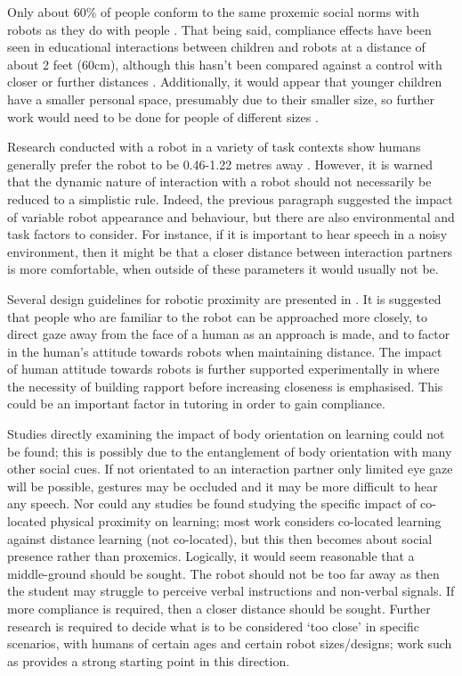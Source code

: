 Only about 60\% of people conform to the same proxemic social norms with robots as they do with people \citep{walters2005influence}. That being said, compliance effects have been seen in educational interactions between children and robots at a distance of about 2 feet (60cm), although this hasn't been compared against a control with closer or further distances \citep{kennedy2014children}. Additionally, it would appear that younger children have a smaller personal space, presumably due to their smaller size, so further work would need to be done for people of different sizes \citep{aiello1974development}.

Research conducted with a robot in a variety of task contexts show humans generally prefer the robot to be 0.46-1.22 metres away \citep{huettenrauch2006investigating}. However, it is warned that the dynamic nature of interaction with a robot should not necessarily be reduced to a simplistic rule. Indeed, the previous paragraph suggested the impact of variable robot appearance and behaviour, but there are also environmental and task factors to consider. For instance, if it is important to hear speech in a noisy environment, then it might be that a closer distance between interaction partners is more comfortable, when outside of these parameters it would usually not be.

Several design guidelines for robotic proximity are presented in \cite{takayama2009influences}. It is suggested that people who are familiar to the robot can be approached more closely, to direct gaze away from the face of a human as an approach is made, and to factor in the human's attitude towards robots when maintaining distance. The impact of human attitude towards robots is further supported experimentally in \cite{mumm2011proxemics} where the necessity of building rapport before increasing closeness is emphasised. This could be an important factor in tutoring in order to gain compliance.

Studies directly examining the impact of body orientation on learning could not be found; this is possibly due to the entanglement of body orientation with many other social cues. If not orientated to an interaction partner only limited eye gaze will be possible, gestures may be occluded and it may be more difficult to hear any speech. Nor could any studies be found studying the specific impact of co-located physical proximity on learning; most work considers co-located learning against distance learning (not co-located), but this then becomes about social presence rather than proxemics. Logically, it would seem reasonable that a middle-ground should be sought. The robot should not be too far away as then the student may struggle to perceive verbal instructions and non-verbal signals. If more compliance is required, then a closer distance should be sought. Further research is required to decide what is to be considered `too close' in specific scenarios, with humans of certain ages and certain robot sizes/designs; work such as \cite{rae2013influence, walters2005influence} provides a strong starting point in this direction.

